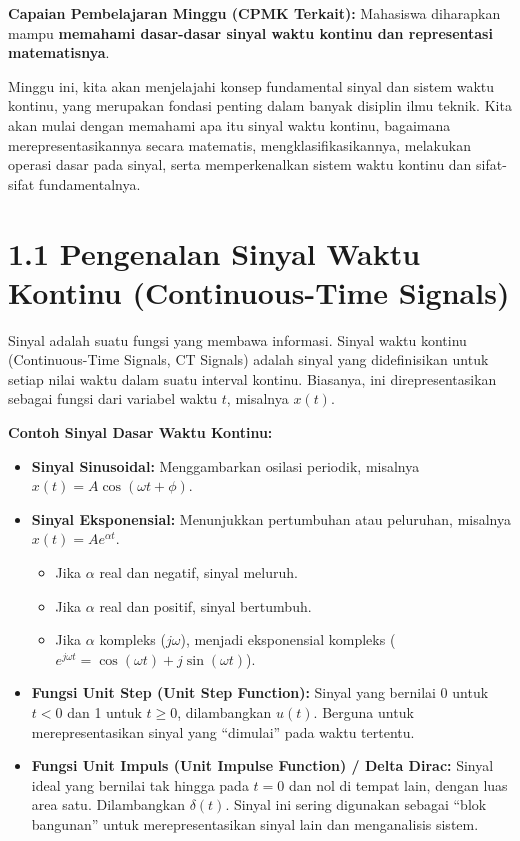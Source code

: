 \documentclass[
  letterpaper,
  DIV=11,
  numbers=noendperiod]{scrreprt}
\providecommand{\tightlist}{%
  \setlength{\itemsep}{0pt}\setlength{\parskip}{0pt}}
\begin{document}
\textbf{Capaian Pembelajaran Minggu (CPMK Terkait):} Mahasiswa
diharapkan mampu \textbf{memahami dasar-dasar sinyal waktu kontinu dan
representasi matematisnya}.

Minggu ini, kita akan menjelajahi konsep fundamental sinyal dan sistem
waktu kontinu, yang merupakan fondasi penting dalam banyak disiplin ilmu
teknik. Kita akan mulai dengan memahami apa itu sinyal waktu kontinu,
bagaimana merepresentasikannya secara matematis, mengklasifikasikannya,
melakukan operasi dasar pada sinyal, serta memperkenalkan sistem waktu
kontinu dan sifat-sifat fundamentalnya.

\section{1.1 Pengenalan Sinyal Waktu Kontinu (Continuous-Time
Signals)}\label{pengenalan-sinyal-waktu-kontinu-continuous-time-signals}

Sinyal adalah suatu fungsi yang membawa informasi. Sinyal waktu kontinu
(Continuous-Time Signals, CT Signals) adalah sinyal yang didefinisikan
untuk setiap nilai waktu dalam suatu interval kontinu. Biasanya, ini
direpresentasikan sebagai fungsi dari variabel waktu \(t\), misalnya
\(x(t)\).

\textbf{Contoh Sinyal Dasar Waktu Kontinu:}

\begin{itemize}
\tightlist
\item
  \textbf{Sinyal Sinusoidal:} Menggambarkan osilasi periodik, misalnya
  \(x(t) = A \cos(\omega t + \phi)\).
\item
  \textbf{Sinyal Eksponensial:} Menunjukkan pertumbuhan atau peluruhan,
  misalnya \(x(t) = A e^{\alpha t}\).

  \begin{itemize}
  \tightlist
  \item
    Jika \(\alpha\) real dan negatif, sinyal meluruh.
  \item
    Jika \(\alpha\) real dan positif, sinyal bertumbuh.
  \item
    Jika \(\alpha\) kompleks (\(j\omega\)), menjadi eksponensial
    kompleks (\(e^{j\omega t} = \cos(\omega t) + j\sin(\omega t)\)).
  \end{itemize}
\item
  \textbf{Fungsi Unit Step (Unit Step Function):} Sinyal yang bernilai 0
  untuk \(t<0\) dan 1 untuk \(t \ge 0\), dilambangkan \(u(t)\). Berguna
  untuk merepresentasikan sinyal yang ``dimulai'' pada waktu tertentu.
\item
  \textbf{Fungsi Unit Impuls (Unit Impulse Function) / Delta Dirac:}
  Sinyal ideal yang bernilai tak hingga pada \(t=0\) dan nol di tempat
  lain, dengan luas area satu. Dilambangkan \(\delta(t)\). Sinyal ini
  sering digunakan sebagai ``blok bangunan'' untuk merepresentasikan
  sinyal lain dan menganalisis sistem.
\end{itemize}
\end{document}
